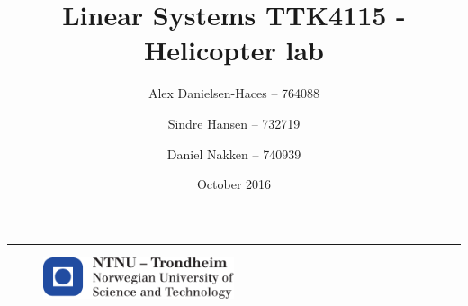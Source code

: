 \documentclass[a4paper]{article}
\title{Linear Systems TTK4115 - Helicopter lab}
\author{
  Alex Danielsen-Haces -- 764088 \and
  Sindre Hansen -- 732719 \and
  Daniel Nakken -- 740939}
\date{October 2016}
\begin{document}
\begin{titlepage}
    \maketitle
    \rule{\linewidth}{0.5mm}
    \begin{figure}
    \centering
    \includegraphics[width=0.5\textwidth]{images/logontnu_eng}
    \end{figure}
    \thispagestyle{empty}
\end{titlepage}

\tableofcontents
\thispagestyle{empty} %
\newpage
\setcounter{page}{1}

\newpage

\newpage

\newpage

\newpage

\end{document}
